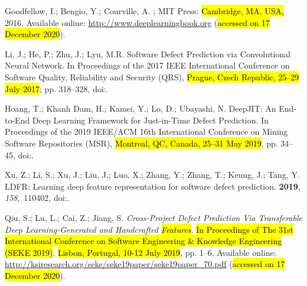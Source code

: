 \documentclass[mathematics,review,accept,moreauthors,pdftex]{Definitions/mdpi}
\begin{document}
\begin{thebibliography}{999}
Goodfellow, I.; Bengio, Y.; Courville, A.
; MIT Press: \hl{Cambridge, MA, USA,} %
  2016.  Available online: 
\newblock \url{http://www.deeplearningbook.org} (\hl{accessed on 17 December 2020}).

{Li}, J.; {He}, P.; {Zhu}, J.; {Lyu}, M.R.
\newblock Software Defect Prediction via Convolutional Neural Network.
\newblock In Proceedings of the 2017 IEEE International Conference on Software Quality, Reliability
  and Security (QRS), \hl{Prague, Czech Republic, 25--29 July 2017}; pp. 318--328,
\newblock
  doi:{\href{https://doi.org/10.1109/QRS.2017.42}{}}.

{Hoang}, T.; {Khanh Dam}, H.; {Kamei}, Y.; {Lo}, D.; {Ubayashi}, N.
\newblock DeepJIT: An End-to-End Deep Learning Framework for Just-in-Time
  Defect Prediction.
\newblock  In Proceedings of the 2019 IEEE/ACM 16th International Conference on Mining Software
  Repositories (MSR), \hl{Montreal, QC, Canada, 25--31 May 2019}, pp. 34--45,
\newblock
  doi:{\href{https://doi.org/10.1109/MSR.2019.00016}{}}.

Xu, Z.; Li, S.; Xu, J.; Liu, J.; Luo, X.; Zhang, Y.; Zhang, T.; Keung, J.;
  Tang, Y.
\newblock LDFR: Learning deep feature representation for software defect
  prediction.
 {\bf 2019}, {\em 158},~110402,
\newblock
  doi:{\href{https://doi.org/https://doi.org/10.1016/j.jss.2019.110402}{}}.

Qiu, S.; Lu, L.; Cai, Z.; Jiang, S.
\newblock \emph{Cross-Project Defect Prediction Via Transferable Deep
  Learning-Generated and Handcrafted \hl{Features}}.
\newblock  \hl{In Proceedings of The 31st International Conference on Software Engineering \& Knowledge Engineering (SEKE 2019)}, \hl{Lisbon, Portugal, 10-12 July 2019}, pp. 1--6,
Available online: 
\newblock \url{http://ksiresearch.org/seke/seke19paper/seke19paper_70.pdf} (\hl{accessed on 17 December 2020}).


\end{thebibliography}
\end{document}
